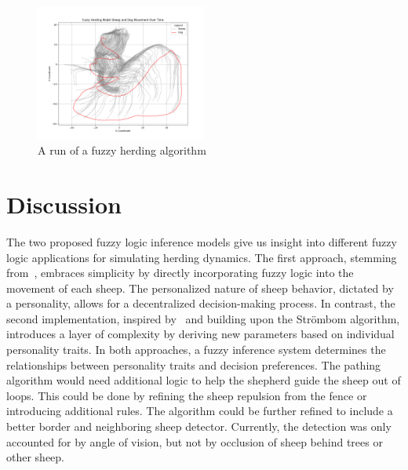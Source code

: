 \documentclass[9pt]{pnas-new}
\begin{document}
\begin{figure}[h]
  \centering
  \includegraphics[width=0.5\textwidth]{fig/fuzzy_steering.png}
  \caption{A run of a fuzzy herding algorithm}
  \label{fig:fuzz2}
\end{figure}

\section*{Discussion}
The two proposed fuzzy logic inference models give us insight into different fuzzy logic applications for simulating herding dynamics. The first approach, stemming from~\cite{bajec2003boids}, embraces simplicity by directly incorporating fuzzy logic into the movement of each sheep. The personalized nature of sheep behavior, dictated by a personality, allows for a decentralized decision-making process. In contrast, the second implementation, inspired by~\cite{fuzzylogic} and building upon the Str\"{o}mbom algorithm, introduces a layer of complexity by deriving new parameters based on individual personality traits. In both approaches, a fuzzy inference system determines the relationships between personality traits and decision preferences. The pathing algorithm would need additional logic to help the shepherd guide the sheep out of loops. This could be done by refining the sheep repulsion from the fence or introducing additional rules. The algorithm could be further refined to include a better border and neighboring sheep detector. Currently, the detection was only accounted for by angle of vision, but not by occlusion of sheep behind trees or other sheep.



\showacknow %
\end{document}
